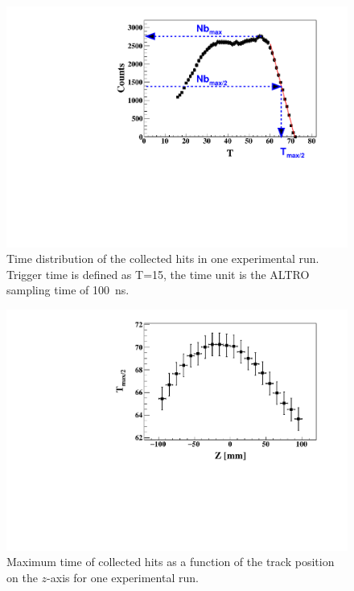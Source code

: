 \documentclass[preprint,5p]{elsarticle}
\begin{document}
\begin{figure}[tb]
   \centering
   \includegraphics[scale=0.42]{fig_2017/hits_time_profile.pdf}
   \caption[]{Time distribution of the collected hits in one experimental run. Trigger
              time is defined as T=15, the time unit is the ALTRO sampling time of 100~ns.} 
   \label{fig:TDC_profile}
\end{figure}

\begin{figure}[tb]
\centering
\includegraphics[scale=0.42]{fig_2017/RunNumber_61452_TDCmax_Zslice.pdf}
\caption{Maximum time of collected hits as a function of the track
              position on the $z$-axis for one experimental run. } 
\label{fig:RunNumber_61551_TDCmax_Zslice}
\end{figure}
\end{document}
